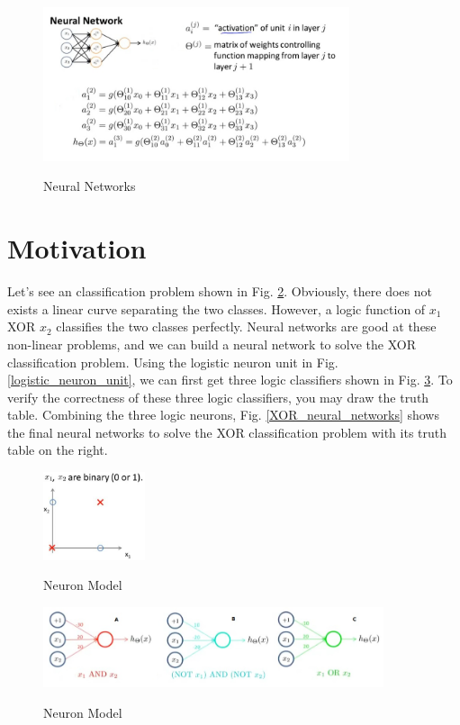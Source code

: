 \documentclass{article}
\begin{document}
\begin{figure}[ht]
  \centering
  \includegraphics[width=9cm]{Figure3.jpg}\\
  \caption{Neural Networks}\label{neural_networks}
\end{figure}
\section{Motivation}
Let's see an classification problem shown in Fig. \ref{XOR_classification_problem}. Obviously, there does not exists a linear curve separating the two classes. However, a logic function of $x_{1}$ XOR $x_{2}$ classifies the two classes perfectly. Neural networks are good at these non-linear problems, and we can build a neural network to solve the XOR classification problem. Using the logistic neuron unit in Fig. \ref{logistic_neuron_unit}, we can first get three logic classifiers shown in Fig. \ref{logic_neurons}. To verify the correctness of these three logic classifiers, you may draw the truth table. Combining the three logic neurons, Fig. \ref{XOR_neural_networks} shows the final neural networks to solve the XOR classification problem with its truth table on the right.
\begin{figure}[ht]
  \centering
  \includegraphics[width=3cm]{Figure4.jpg}\\
  \caption{Neuron Model}\label{XOR_classification_problem}
\end{figure}
\begin{figure}[ht]
  \centering
  \includegraphics[width=10cm]{Figure5.jpg}\\
  \caption{Neuron Model}\label{logic_neurons}
\end{figure}
\end{document}
